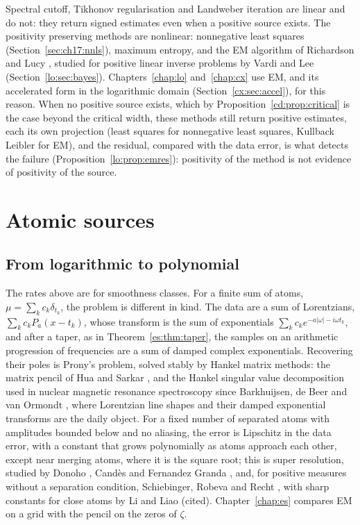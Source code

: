 Spectral cutoff, Tikhonov regularisation and Landweber iteration are linear and do not: they return signed estimates even when a positive source exists. The positivity preserving methods are nonlinear: nonnegative least squares (Section~\ref{sec:ch17:nnls}), maximum entropy, and the EM algorithm of Richardson and Lucy \cite{Richardson72,Lucy74}, studied for positive linear inverse problems by Vardi and Lee \cite{VardiLee93} (Section~\ref{lo:sec:bayes}). Chapters~\ref{chap:lo} and~\ref{chap:cx} use EM, and its accelerated form in the logarithmic domain (Section~\ref{cx:sec:accel}), for this reason. When no positive source exists, which by Proposition~\ref{cd:prop:critical} is the case beyond the critical width, these methods still return positive estimates, each its own projection (least squares for nonnegative least squares, Kullback Leibler for EM), and the residual, compared with the data error, is what detects the failure (Proposition~\ref{lo:prop:emres}): positivity of the method is not evidence of positivity of the source.

\section{Atomic sources}\label{cd:sec:atomic}

\subsection{From logarithmic to polynomial}

The rates above are for smoothness classes. For a finite sum of atoms, $\mu=\sum_kc_k\delta_{t_k}$, the problem is different in kind. The data are a sum of Lorentzians, $\sum_kc_kP_a(x-t_k)$, whose transform is the sum of exponentials $\sum_kc_ke^{-a|\omega|-i\omega t_k}$, and after a taper, as in Theorem~\ref{es:thm:taper}, the samples on an arithmetic progression of frequencies are a sum of damped complex exponentials. Recovering their poles is Prony's problem, solved stably by Hankel matrix methods: the matrix pencil of Hua and Sarkar \cite{HuaSarkar90}, and the Hankel singular value decomposition used in nuclear magnetic resonance spectroscopy since Barkhuijsen, de Beer and van Ormondt \cite{Barkhuijsen87}, where Lorentzian line shapes and their damped exponential transforms are the daily object. For a fixed number of separated atoms with amplitudes bounded below and no aliasing, the error is Lipschitz in the data error, with a constant that grows polynomially as atoms approach each other, except near merging atoms, where it is the square root; this is super resolution, studied by Donoho \cite{Donoho92}, Cand\`es and Fernandez Granda \cite{CandesFG14}, and, for positive measures without a separation condition, Schiebinger, Robeva and Recht \cite{SchiebingerRR18}, with sharp constants for close atoms by Li and Liao \cite{LiLiao21} (cited). Chapter~\ref{chap:es} compares EM on a grid with the pencil on the zeros of $\zeta$.

